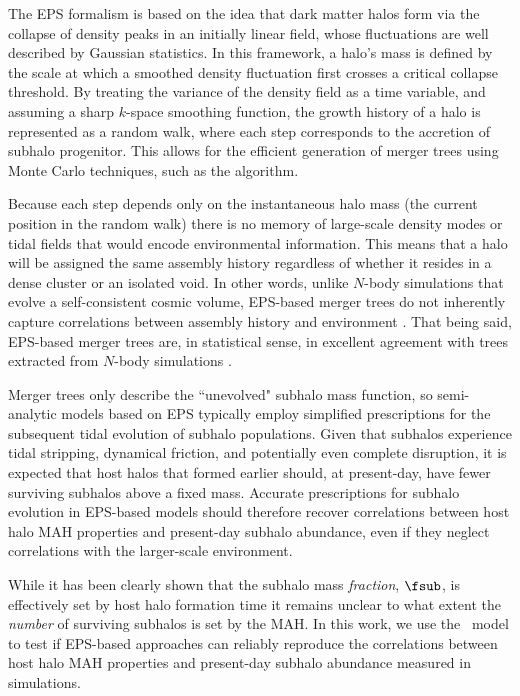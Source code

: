 The EPS formalism is based on the idea that dark matter halos form via the collapse of density peaks in an initially linear field, whose fluctuations are well described by Gaussian statistics. In this framework, a halo’s mass is defined by the scale at which a smoothed density fluctuation first crosses a critical collapse threshold. By treating the variance of the density field as a time variable, and assuming a sharp $k$-space smoothing function, the growth history of a halo is represented as a random walk, where each step corresponds to the accretion of subhalo progenitor. This allows for the efficient generation of merger trees using Monte Carlo techniques, such as the \cite{Parkinson.etal.08} algorithm.

Because each step depends only on the instantaneous halo mass (the current position in the random walk) there is no memory of large-scale density modes or tidal fields that would encode environmental information. This means that a halo will be assigned the same assembly history regardless of whether it resides in a dense cluster or an isolated void. In other words, unlike $N$-body simulations that evolve a self-consistent cosmic volume, EPS-based merger trees do not inherently capture correlations between assembly history and environment \cite{Gao.etal.05, Zentner.07, Ma.etal.11, Zhang.etal.14}. That being said, EPS-based merger trees are, in statistical sense, in excellent agreement with trees extracted from $N$-body simulations \citep{Jiang.vdBosch.14, vdBosch.etal.14}.

Merger trees only describe the ``unevolved" subhalo mass function, so semi-analytic models based on EPS typically employ simplified prescriptions for the subsequent tidal evolution of subhalo populations. Given that subhalos experience tidal stripping, dynamical friction, and potentially even complete disruption, it is expected that host halos that formed earlier should, at present-day, have fewer surviving subhalos above a fixed mass. Accurate prescriptions for subhalo evolution in EPS-based models should therefore recover correlations between host halo MAH properties and present-day subhalo abundance, even if they neglect correlations with the larger-scale environment. 

While it has been clearly shown that the subhalo mass \textit{fraction}, $\fsub$, is effectively set by host halo formation time \citep{Giocoli.etal.10, Jiang.vdBosch.17} it remains unclear to what extent the \textit{number} of surviving subhalos is set by the MAH. In this work, we use the \SatGen\ model \citep{Jiang.etal.21, Green.etal.21} to test if EPS-based approaches can reliably reproduce the correlations between host halo MAH properties and present-day subhalo abundance measured in simulations.

